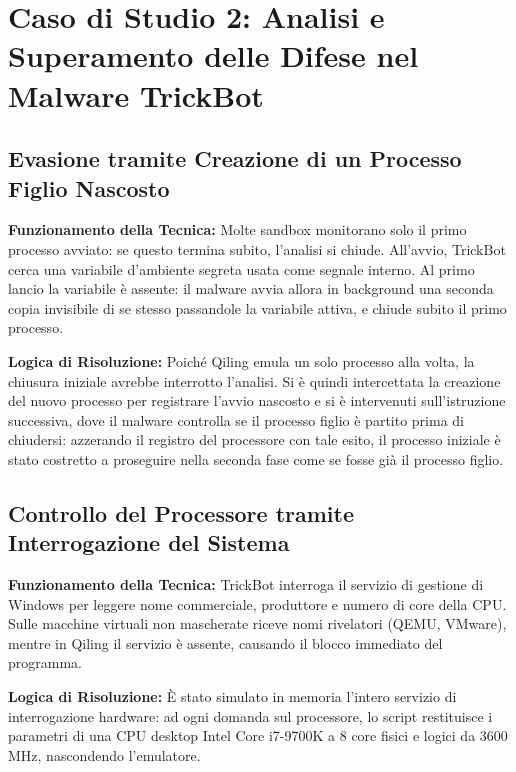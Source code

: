 \documentclass[11pt, a4paper]{article}
\begin{document}
	\section{Caso di Studio 2: Analisi e Superamento delle Difese nel Malware TrickBot}
	
	\subsection{Evasione tramite Creazione di un Processo Figlio Nascosto}
	
	\textbf{Funzionamento della Tecnica:} Molte sandbox monitorano solo il primo processo avviato: se questo termina subito, l'analisi si chiude. All'avvio, TrickBot cerca una variabile d'ambiente segreta usata come segnale interno. Al primo lancio la variabile è assente: il malware avvia allora in background una seconda copia invisibile di se stesso passandole la variabile attiva, e chiude subito il primo processo.
	
	\textbf{Logica di Risoluzione:} Poiché Qiling emula un solo processo alla volta, la chiusura iniziale avrebbe interrotto l'analisi. Si è quindi intercettata la creazione del nuovo processo per registrare l'avvio nascosto e si è intervenuti sull'istruzione successiva, dove il malware controlla se il processo figlio è partito prima di chiudersi: azzerando il registro del processore con tale esito, il processo iniziale è stato costretto a proseguire nella seconda fase come se fosse già il processo figlio.
	
	\subsection{Controllo del Processore tramite Interrogazione del Sistema}
	
	\textbf{Funzionamento della Tecnica:} TrickBot interroga il servizio di gestione di Windows per leggere nome commerciale, produttore e numero di core della CPU. Sulle macchine virtuali non mascherate riceve nomi rivelatori (QEMU, VMware), mentre in Qiling il servizio è assente, causando il blocco immediato del programma.
	
	\textbf{Logica di Risoluzione:} È stato simulato in memoria l'intero servizio di interrogazione hardware: ad ogni domanda sul processore, lo script restituisce i parametri di una CPU desktop Intel Core i7-9700K a 8 core fisici e logici da 3600 MHz, nascondendo l'emulatore.
	
\end{document}
